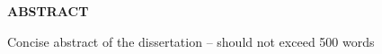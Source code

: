 



\begin{center}
	{\Large{\bf{ABSTRACT}}}\\
\end{center}

Concise abstract of the dissertation -- should not exceed 500 words
